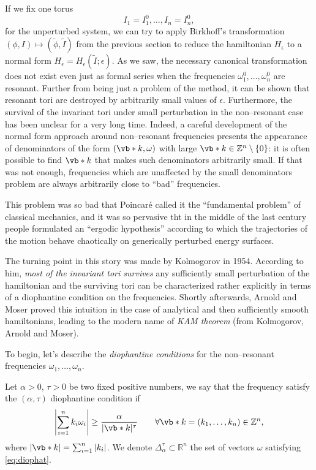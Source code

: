 \documentclass[english,fontsize=11pt,paper=b5]{scrbook}
\numberwithin{equation}{chapter}
\theoremstyle{definition}
\begin{document}
      If we fix one torus
      \begin{equation}
        I_1 = I_1^0, \ldots, I_n = I_n^0,
      \end{equation}
      for the unperturbed system, we can try to apply Birkhoff's transformation $(\phi, I)\mapsto(\widetilde\phi,\widetilde I)$ from the previous section to reduce the hamiltonian $H_\epsilon$ to a normal form $H_\epsilon = H_\epsilon(\widetilde I; \epsilon)$.
      As we saw, the necessary canonical transformation does not exist even just as formal series when the frequencies $\omega_1^0, \ldots, \omega_n^0$ are resonant.
      Further from being just a problem of the method, it can be shown that resonant tori are destroyed by arbitrarily small values of $\epsilon$.
      Furthermore, the survival of the invariant tori under small perturbation in the non--resonant case has been unclear for a very long time. Indeed, a careful development of the normal form approach around non--resonant frequencies presents the appearance of denominators of the form $(\vb* k, \omega)$ with large $\vb* k \in\mathbb{Z}^n\setminus\{0\}$: it is often possible to find $\vb* k$ that makes such denominators arbitrarily small. If that was not enough, frequencies which are unaffected by the small denominators problem are always arbitrarily close to ``bad'' frequencies.

      This problem was so bad that Poincar\'e called it the ``fundamental problem'' of classical mechanics, and it was so pervasive tht in the middle of the last century people formulated an ``ergodic hypothesis'' according to which the trajectories of the motion behave chaotically on generically perturbed energy surfaces.

      The turning point in this story was made by Kolmogorov in 1954.
      According to him, \emph{most of the invariant tori survives} any sufficiently small perturbation of the hamiltonian and the surviving tori can be characterized rather explicitly in terms of a diophantine condition on the frequencies.
      Shortly afterwards, Arnold and Moser proved this intuition in the case of analytical and then sufficiently smooth hamiltonians,
      leading to the modern name of \emph{KAM theorem} (from Kolmogorov, Arnold and Moser).

      To begin, let's describe the \emph{diophantine conditions} for the non--resonant frequencies $\omega_1, \ldots, \omega_n$.

      \begin{tcolorbox}
        Let $\alpha>0$, $\tau>0$ be two fixed positive numbers, we say that the frequency satisfy the $(\alpha,\tau)$ diophantine condition if
        \begin{equation}\label{eq:diophat}
          \left|\sum_{i=1}^n k_i \omega_i \right| \geq \frac{\alpha}{|\vb* k|^\tau} \qquad \forall \vb* k=(k_1, \ldots, k_n)\in\mathbb{Z}^n,
        \end{equation}
        where $|\vb* k| = \sum_{i=1}^n |k_i|$.
        We denote $\Delta_\alpha^\tau\subset\mathbb{R}^n$ the set of vectors $\omega$ satisfying \eqref{eq:diophat}.
      \end{tcolorbox}
\end{document}
